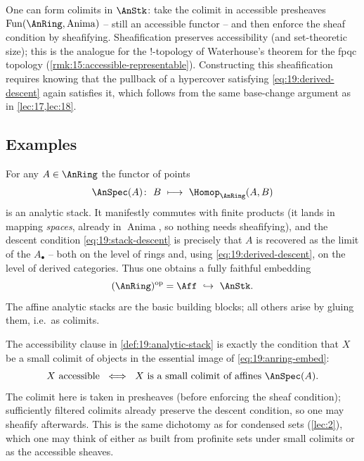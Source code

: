 \begin{remark}
\label{rmk:19:sheafification}
One can form colimits in $\AnStk$: take the colimit in accessible presheaves
$\operatorname{Fun}(\AnRing,\operatorname{Anima})$ -- still an accessible functor
-- and then enforce the sheaf condition by sheafifying. Sheafification preserves
accessibility (and set-theoretic size); this is the analogue for the
$!$-topology of Waterhouse's theorem \cite{Waterhouse_1975} for the fpqc
topology (\cref{rmk:15:accessible-representable}). Constructing this
sheafification requires knowing that the pullback of a hypercover satisfying
\eqref{eq:19:derived-descent} again satisfies it, which follows from the same
base-change argument as in \cref{lec:17,lec:18}.
\end{remark}

\subsection{Examples}
\label{subsec:19:examples}

\begin{example}
\label{ex:19:affine}
For any $A\in\AnRing$ the functor of points
\begin{equation*}
\AnSpec(A)\colon\ B\ \longmapsto\ \Homop_{\AnRing}(A,B)
\end{equation*}
is an analytic stack. It manifestly commutes with finite products (it lands in
mapping \emph{spaces}, already in $\operatorname{Anima}$, so nothing needs
sheafifying), and the descent condition \eqref{eq:19:stack-descent} is precisely
that $A$ is recovered as the limit of the $A_\bullet$ -- both on the level of
rings and, using \eqref{eq:19:derived-descent}, on the level of derived
categories. Thus one obtains a fully faithful embedding
\begin{equation}
\label{eq:19:anring-embed}
(\AnRing)^{\mathrm{op}}=\Aff\ \hookrightarrow\ \AnStk .
\end{equation}
The affine analytic stacks are the basic building blocks; all others arise by
gluing them, i.e.\ as colimits.
\end{example}

\begin{remark}
\label{rmk:19:accessible-colimit}
The accessibility clause in \cref{def:19:analytic-stack} is exactly the
condition that $X$ be a small colimit of objects in the essential image of
\eqref{eq:19:anring-embed}:
\begin{equation*}
X\ \text{accessible}\ \iff\ X\ \text{is a small colimit of affines }\AnSpec(A).
\end{equation*}
The colimit here is taken in presheaves (before enforcing the sheaf condition);
sufficiently filtered colimits already preserve the descent condition, so one may
sheafify afterwards. This is the same dichotomy as for condensed sets
(\cref{lec:2}), which one may think of either as built from profinite sets under
small colimits or as the accessible sheaves.
\end{remark}

